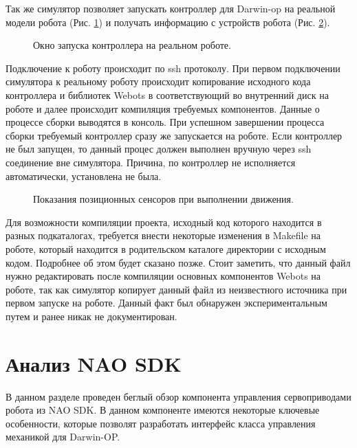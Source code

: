 Так же симулятор позволяет запускать контроллер для Darwin-op на реальной модели робота (Рис. \ref{im:1_webots_transfer}) и получать информацию с устройств робота (Рис. \ref{im:1_webots_position_sensors}).

\begin{figure}[h]
\caption{Окно запуска контроллера на реальном роботе.}
\label{im:1_webots_transfer}
\end{figure}

Подключение к роботу происходит по ssh протоколу. При первом подключении симулятора к реальному роботу происходит копирование исходного кода контроллера и библиотек Webots в соответствующий во внутренний диск на роботе и далее происходит компиляция требуемых компонентов. Данные о процессе сборки выводятся в консоль. При успешном завершении процесса сборки требуемый контроллер сразу же запускается на роботе. Если контроллер не был запущен, то данный процес должен выполнен вручную через ssh соединение вне симулятора. Причина, по контроллер не исполняется автоматически, установлена не была.

\begin{figure}[h]
\caption{Показания позиционных сенсоров при выполнении движения.}
\label{im:1_webots_position_sensors}
\end{figure}

Для возможности компиляции проекта, исходный код которого находится в разных подкаталогах, требуется внести некоторые изменения в Makefile на роботе, который находится в родительском каталоге директории с исходным кодом. Подробнее об этом будет сказано позже. Стоит заметить, что данный файл нужно редактировать после компиляции основных компонентов Webots на роботе, так как симулятор копирует данный файл из неизвестного источника при первом запуске на роботе. Данный факт был обнаружен экспериментальным путем и ранее никак не документирован.

\section{Анализ NAO SDK}

В данном разделе проведен беглый обзор компонента управления сервоприводами робота из NAO SDK. В данном компоненте имеются некоторые ключевые особенности, которые позволят разработать интерфейс класса управления механикой для Darwin-OP.

